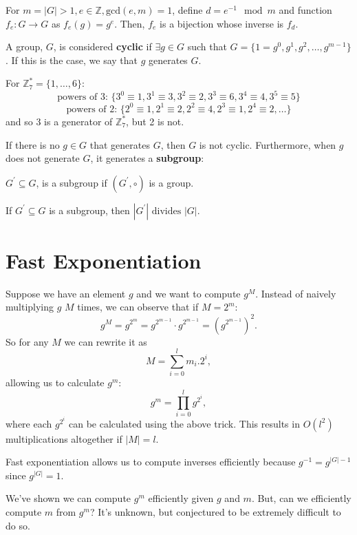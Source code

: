 \begin{corollary}
	For \(m = |G| > 1, e \in \mathbb{Z}, \text{gcd}(e, m) = 1\), define
	\(d = e^{-1} \mod m\) and function \(f_e \colon G \to G\) as \(f_e(g) = g^e\).    
	Then, \(f_e\) is a bijection whose inverse is \(f_d\).  
\end{corollary}

\begin{definition}\label{def:cyclicgroup}
	A group, \(G\), is considered \textbf{cyclic} if \(\exists g \in G\) such
	that \(G = \{1 = g^0, g^1, g^2, \ldots, g^{m - 1}\}\). If this is the case,
	we say that \(g\) generates \(G\).   
\end{definition}

\begin{eg}
	For \(\mathbb{Z}_7^* = \{1, \ldots, 6\}\):
	\[
		\text{powers of 3: } \{ 3^0 \equiv 1, 3^1 \equiv 3, 3^2 \equiv 2, 3^3 \equiv 6, 3^4 \equiv 4, 3^5 \equiv 5\}
	\]
	\[
		\text{powers of 2: } \{ 2^0 \equiv 1, 2^1 \equiv 2, 2^2 \equiv 4, 2^3 \equiv 1, 2^4 \equiv 2, \ldots \}
	\]
	and so 3 is a generator of \(\mathbb{Z}_7^*\), but 2 is not.
\end{eg}

If there is no \(g \in G\) that generates \(G\), then \(G\) is not cyclic. Furthermore,
when \(g\) does not generate \(G\), it generates a \textbf{subgroup}:

\begin{definition}
	\(G^{\prime} \subseteq G\), is a subgroup if \((G^{\prime}, \circ)\) is a group.  
\end{definition}

\begin{theorem}
	If \(G^{\prime} \subseteq G\) is a subgroup, then \(|G^{\prime}|
	\text{ divides } |G|\).
\end{theorem}

\section{Fast Exponentiation}
Suppose we have an element \(g\) and we want to compute \(g^M\). Instead of
naively multiplying \(g\) \(M\) times, we can observe that if \(M = 2^m\):
\[
	g^{M} = g^{2^m} = g^{2^{m - 1}} \cdot g^{2^{m - 1}} = (g^{2^{m - 1}})^2.
\]
So for any \(M\) we can rewrite it as
\[
	M = \sum_{i = 0}^l m_i . 2^i,
\]
allowing us to calculate \(g^m\):
\[
	g^m = \prod_{i=0}^{l} g^{2^i},
\]
where each \(g^{2^i}\) can be calculated using the above trick. This
results in \(O(l^2)\) multiplications altogether if \(|M| = l\).

\begin{corollary}
	Fast exponentiation allows us to compute inverses efficiently because
	\(g^{-1} = g^{|G| - 1}\) since \(g^{|G|} = 1\).  
\end{corollary}

We've shown we can compute \(g^m\) efficiently given \(g\) and \(m\). But,
can we efficiently compute \(m\) from \(g^m\)? It's unknown, but conjectured
to be extremely difficult to do so.     